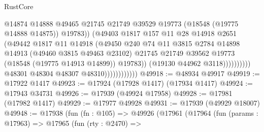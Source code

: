 \begin{lexlean}{RustCore}
\begin{coremodule}
                                                @14874
                                                @14888
                                                @49465
                                                @21745
                                                @21749
                                                @39529
                                                @19773
                                                (@18548 (@19775 @14888 @14875))
                                                @19783))
                                            (@49403
                                              @1817
                                              @157
                                              @11
                                              @28
                                              @14918
                                              @2651
                                              (@49442
                                                @1817
                                                @11
                                                @14918
                                                (@49450
                                                  @240
                                                  @74
                                                  @11
                                                  @3815
                                                  @2784
                                                  @14898
                                                  @14913
                                                  (@49460 @3815 @49463 @23102)
                                                  @21745
                                                  @21749
                                                  @39562
                                                  @19773
                                                  (@18548 (@19775 @14913 @14899))
                                                  @19783))
                                              (@19130 @44962 @3118))))))))))
                            @48301
                            @48304
                            @48307
                            @48310))))))))))))
@49918 := @48934 @49917
@49919 := @17922 @1417
@49923 := @17924 (@17928 @1417) (@17934 @1417)
@49924 := @17943 @34731
@49926 := @17939 (@49924 @17958)
@49928 := @17981 (@17982 @1417)
@49929 := @17977 @49928
@49931 := @17939 (@49929 @18007)
@49948 := @17938
    (fun (fn : @105) =>
    @49926
      (@17961
        (@17964
          (fun (params : @17963) =>
          @17965
            (fun (rty : @2470) =>

\end{coremodule}
\end{lexlean}
